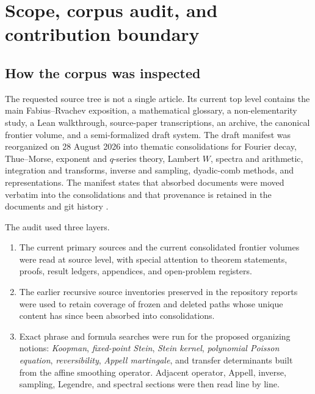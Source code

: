 \documentclass[11pt,a4paper]{article}
\theoremstyle{definition}
\theoremstyle{remark}
\begin{document}
\tableofcontents
\clearpage
{}

\section{Scope, corpus audit, and contribution boundary}
\label{sec:scope}

\subsection{How the corpus was inspected}

The requested source tree is not a single article. Its current top level contains the main Fabius--Rvachev exposition, a mathematical glossary, a non-elementarity study, a Lean walkthrough, source-paper transcriptions, an archive, the canonical frontier volume, and a semi-formalized draft system. The draft manifest was reorganized on 28 August 2026 into thematic consolidations for Fourier decay, Thue--Morse, exponent and $q$-series theory, Lambert $W$, spectra and arithmetic, integration and transforms, inverse and sampling, dyadic-comb methods, and representations. The manifest states that absorbed documents were moved verbatim into the consolidations and that provenance is retained in the documents and git history \cite{ProveItManifest}.

The audit used three layers.
\begin{enumerate}
\item The current primary sources and the current consolidated frontier volumes were read at source level, with special attention to theorem statements, proofs, result ledgers, appendices, and open-problem registers.
\item The earlier recursive source inventories preserved in the repository reports were used to retain coverage of frozen and deleted paths whose unique content has since been absorbed into consolidations.
\item Exact phrase and formula searches were run for the proposed organizing notions: \emph{Koopman}, \emph{fixed-point Stein}, \emph{Stein kernel}, \emph{polynomial Poisson equation}, \emph{reversibility}, \emph{Appell martingale}, and transfer determinants built from the affine smoothing operator. Adjacent operator, Appell, inverse, sampling, Legendre, and spectral sections were then read line by line.
\end{enumerate}
\end{document}
